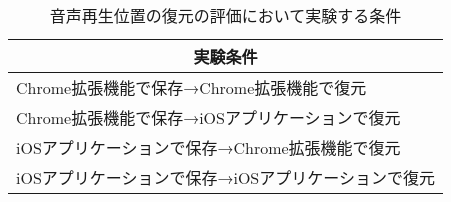 \begin{table}[htbp]
  \label{tb:evl-audio-audio-conditions}
  \caption{音声再生位置の復元の評価において実験する条件}
  \begin{center}
    \begin{tabular}{|l|}
    \hline
    \multicolumn{1}{|c|}{\textbf{実験条件}} \\\hline
    Chrome拡張機能で保存→Chrome拡張機能で復元 \\ \hline
    Chrome拡張機能で保存→iOSアプリケーションで復元 \\ \hline
    iOSアプリケーションで保存→Chrome拡張機能で復元 \\ \hline
    iOSアプリケーションで保存→iOSアプリケーションで復元 \\ \hline
    \end{tabular}
  \end{center}
\end{table}
